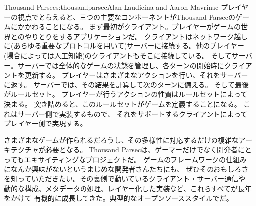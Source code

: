 \begin{aosachapter}{Thousand Parsec}{s:thousandparsec}{Alan Laudicina and Aaron Mavrinac}
プレイヤーの視点でとらえると、三つの主要なコンポーネントがThousand Parsecのゲームにかかわることになる。
まず最初がクライアント。プレイヤーがゲームの世界とのやりとりをするアプリケーションだ。
クライアントはネットワーク越しに(あらゆる重要なプロトコルを用いて)サーバーに接続する。他のプレイヤー
(場合によっては人工知能)のクライアントもそこに接続している。
そしてサーバー。サーバーでは全体的なゲームの状態を管理し、各ターンの開始時にクライアントを更新する。
プレイヤーはさまざまなアクションを行い、それをサーバーに返す。
サーバーでは、その結果を計算して次のターンに備える。
そして最後がルールセット。
プレイヤーが行うアクションの性質はルールセットによって決まる。
突き詰めると、このルールセットがゲームを定義することになる。
これはサーバー側で実装するもので、
それをサポートするクライアントによってプレイヤー側で実現する。

さまざまなゲームが作られるだろうし、その多様性に対応するだけの複雑なアーキテクチャが必要となる。
Thousand Parsecは、ゲーマーだけでなく開発者にとってもエキサイティングなプロジェクトだ。
ゲームのフレームワークの仕組みになんか興味がないというまじめな開発者さんたちにも、
ぜひそのおもしろさを知っていただきたい。その裏側で動いているクライアント・サーバー通信や
動的な構成、メタデータの処理、レイヤー化した実装など、これらすべてが長年をかけて
有機的に成長してきた。典型的なオープンソーススタイルでだ。


\end{aosachapter}
